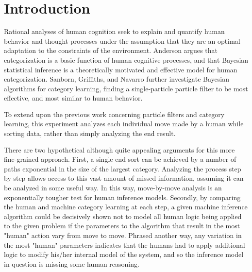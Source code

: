 \section{Introduction}
\label{sec:intro}

Rational analyses of human cognition seek to explain and quantify human behavior
and thought processes under the assumption that they are an optimal adaptation
to the constraints of the environment. Anderson \cite{anderson1991} argues that
categorization is a basic function of human cognitive processes, and that
Bayesian statistical inference is a theoretically motivated and effective model
for human categorization. Sanborn, Griffiths, and Navarro \cite{sanborn2010}
further investigate Bayesian algorithms for category learning, finding a
single-particle particle filter to be most effective, and most similar to human behavior.

To extend upon the previous work concerning particle filters and category
learning, this experiment analyzes each individual move made by a human while
sorting data, rather than simply analyzing the end result.

There are two hypothetical although quite appealing arguments for this more
fine-grained approach. First, a single end sort can be achieved by a number of
paths exponential in the size of the largest category. Analyzing the process
step by step allows access to this vast amount of missed information, assuming
it can be analyzed in some useful way. In this way, move-by-move analysis is an
exponentially tougher test for human inference models. Secondly, by comparing
the human and machine category learning at each step, a given machine inference
algorithm could be decisively shown not to model all human logic being applied
to the given problem if the parameters to the algorithm that result in the most
"human" action vary from move to move. Phrased another way, any variation in the
most "human" parameters indicates that the humans had to apply additional logic
to modify his/her internal model of the system, and so the inference model in
question is missing some human reasoning.
